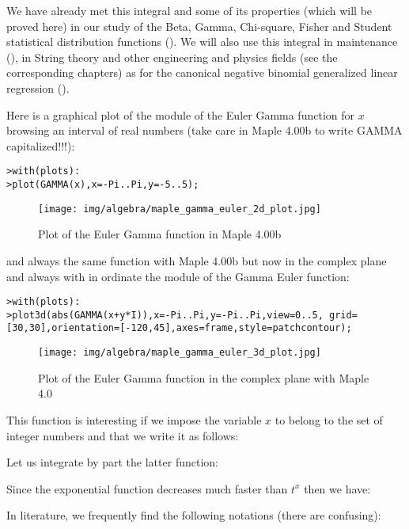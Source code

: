 	\begin{tcolorbox}[title=Remark,colframe=black,arc=10pt]
		We have already met this integral and some of its properties (which will be proved here) in our study of the Beta, Gamma, Chi-square, Fisher and Student statistical distribution functions (). We will also use this integral in maintenance (), in String theory and other engineering and physics fields (see the corresponding chapters) as for the canonical negative binomial generalized linear regression ().
	\end{tcolorbox}
	
	Here is a graphical plot of the module of the Euler Gamma function for $x$ browsing an interval of real numbers (take care in Maple 4.00b to write GAMMA capitalized!!!):
	
	\texttt{>with(plots):\\}
	\texttt{>plot(GAMMA(x),x=-Pi..Pi,y=-5..5);}
	\begin{figure}[H]
		\centering
		\texttt{[image: img/algebra/maple\_gamma\_euler\_2d\_plot.jpg]}
		\caption{Plot of the Euler Gamma function in Maple 4.00b}
	\end{figure}
	and always the same function with Maple 4.00b but now in the complex plane and always with in ordinate the module of the Gamma Euler function:
	
	\texttt{>with(plots):\\}
	\texttt{>plot3d(abs(GAMMA(x+y*I)),x=-Pi..Pi,y=-Pi..Pi,view=0..5, grid=[30,30],orientation=[-120,45],axes=frame,style=patchcontour);}
	
	\begin{figure}[H]
		\centering
		\texttt{[image: img/algebra/maple\_gamma\_euler\_3d\_plot.jpg]}
		\caption{Plot of the Euler Gamma function in the complex plane with Maple 4.0}
	\end{figure}
	This function is interesting if we impose the variable $x$ to belong to the set of integer numbers and that we write it as follows:
	
	Let us integrate by part the latter function:
	
	Since the exponential function decreases much faster than $t^x$ then we have:
	
	In literature, we frequently find the following notations (there are confusing):
	
